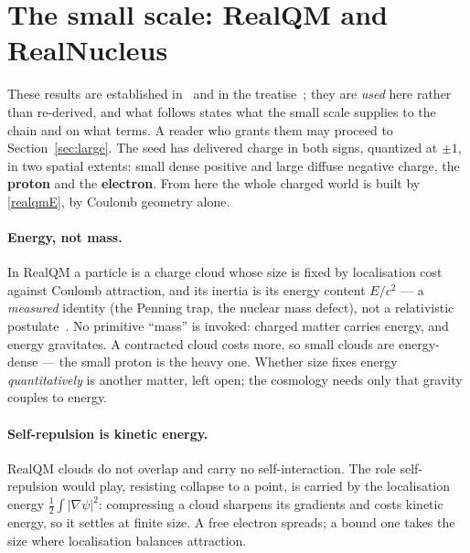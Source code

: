 \documentclass[11pt]{article}
\newcommand{\grad}{\nabla}
\newcommand{\half}{\tfrac{1}{2}}
\begin{document}
\section{The small scale: RealQM and RealNucleus}\label{sec:small}
These results are established in~\cite{realqm,realnucleus} and in the treatise~\cite{realqmbook}; they are
\emph{used} here rather than re-derived, and what follows states what the small scale supplies to the chain and
on what terms. A reader who grants them may proceed to Section~\ref{sec:large}.
The seed has delivered charge in both signs, quantized at $\pm1$, in two spatial extents: small dense positive and
large diffuse negative charge, the \textbf{proton} and the \textbf{electron}. From here the whole charged world is
built by \eqref{realqmE}, by Coulomb geometry alone.

\paragraph{Energy, not mass.} In RealQM a particle is a charge cloud whose size is fixed by localisation cost
against Coulomb attraction, and its inertia is its energy content $E/c^2$ --- a \emph{measured} identity (the
Penning trap, the nuclear mass defect), not a relativistic postulate~\cite{nomass}. No primitive ``mass'' is
invoked: charged matter carries energy, and energy gravitates. A contracted cloud costs more, so small clouds are
energy-dense --- the small proton is the heavy one. Whether size fixes energy \emph{quantitatively} is another
matter, left open; the cosmology needs only that gravity couples to energy.

\paragraph{Self-repulsion is kinetic energy.} RealQM clouds do not overlap and carry no self-interaction. The role
self-repulsion would play, resisting collapse to a point, is carried by the localisation energy
$\half\int|\grad\psi|^2$: compressing a cloud sharpens its gradients and costs kinetic energy, so it settles at
finite size. A free electron spreads; a bound one takes the size where localisation balances attraction.
\end{document}
